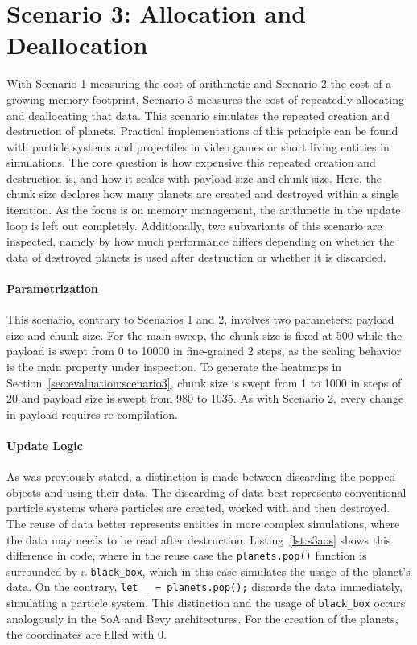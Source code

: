 \section{Scenario 3: Allocation and Deallocation}
\label{sec:benchmarks:scenario3}
With Scenario 1 measuring the cost of arithmetic and Scenario 2 the cost of a growing memory footprint, Scenario 3 measures the cost of repeatedly allocating and deallocating that data. This scenario simulates the repeated creation and destruction of planets. Practical implementations of this principle can be found with particle systems and projectiles in video games or short living entities in simulations. The core question is how expensive this repeated creation and destruction is, and how it scales with payload size and chunk size. Here, the chunk size declares how many planets are created and destroyed within a single iteration. As the focus is on memory management, the arithmetic in the update loop is left out completely. Additionally, two subvariants of this scenario are inspected, namely by how much performance differs depending on whether the data of destroyed planets is used after destruction or whether it is discarded.

\paragraph{Parametrization}
This scenario, contrary to Scenarios 1 and 2, involves two parameters: payload size and chunk size. For the main sweep, the chunk size is fixed at \num{500} while the payload is swept from \qty{0}{\byte} to \qty{10000}{\byte} in fine-grained \qty{2}{\byte} steps, as the scaling behavior is the main property under inspection. To generate the heatmaps in Section~\ref{sec:evaluation:scenario3}, chunk size is swept from 1 to 1000 in steps of 20 and payload size is swept from \qty{980}{\byte} to \qty{1035}{\byte}. As with Scenario 2, every change in payload requires re-compilation.

\paragraph{Update Logic}
As was previously stated, a distinction is made between discarding the popped objects and using their data. The discarding of data best represents conventional particle systems where particles are created, worked with and then destroyed. The reuse of data better represents entities in more complex simulations, where the data may needs to be read after destruction. Listing~\ref{lst:s3aos} shows this difference in code, where in the reuse case the \texttt{planets.pop()} function is surrounded by a \texttt{black\_box}, which in this case simulates the usage of the planet's data. On the contrary, \texttt{let \_ = planets.pop();} discards the data immediately, simulating a particle system. This distinction and the usage of \texttt{black\_box} occurs analogously in the \ac{SoA} and Bevy architectures. For the creation of the planets, the coordinates are filled with \num{0}.

